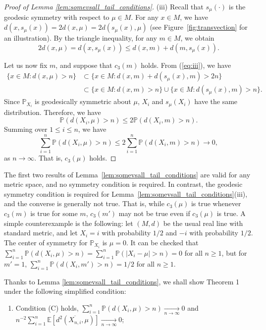 \documentclass[preprint]{imsart}
\theoremstyle{plain}
\newtheorem{remark}{Remark}
\theoremstyle{remark}
\begin{document}
\begin{appendix}
\begin{proof}[Proof of Lemma \ref{lem:somevsall_tail_conditions}]
(iii) Recall that $s_\mu(\cdot)$ is the geodesic symmetry with respect to $\mu \in M$. For any $x \in M$, we have 
$d(x, s_\mu(x)) = 2d(x,\mu) = 2d(s_\mu(x),\mu)$ (see Figure~\ref{fig:transvection} for an illustration). By the triangle inequality, for any $m\in M$, we obtain 
\begin{equation}
    \label{eq:iii} 
    2d(x,\mu) = d(x, s_\mu(x)) \le d(x,m ) + d(m, s_\mu(x)).
\end{equation}

Let us now fix $m$, and suppose that $c_3(m)$ holds. 
From (\ref{eq:iii}), we have 
\begin{align*}
\{x\in M: d(x,\mu) > n\} &\subset \{x\in M: d(x,m) + d(s_\mu(x), m) > 2n\}\\
&\subset \{x\in M: d(x,m) > n\}\cup \{x\in M: d(s_\mu(x),m) > n\}.
\end{align*}
Since $\mathbb{P}_{X_i}$ is geodesically symmetric about $\mu$, $X_i$ and $s_\mu (X_i)$ have the same distribution. Therefore, we have 
$$
\mathbb{P}(d(X_i,\mu) > n ) \le 2\mathbb{P}(d(X_i,m) > n).$$
Summing over $1\le i\le n$, we have 
$$
\sum_{i=1}^n\mathbb{P}(d(X_i,\mu) > n ) \le 2\sum_{i=1}^n\mathbb{P}(d(X_i,m) > n) \to 0,
$$
as $n\to \infty$. That is, $c_3(\mu)$ holds.
\end{proof}


The first two results of Lemma~\ref{lem:somevsall_tail_conditions} are valid for any metric space, and no symmetry condition is required. In contrast, the geodesic symmetry condition is required for Lemma~\ref{lem:somevsall_tail_conditions}(iii), and the converse is generally not true. That is, while $c_3(\mu)$ is true whenever $c_3(m)$ is true for some $m$, $c_3(m')$ may not be true even if $c_3(\mu)$ is true. A simple counterexample is the following: let $(M,d)$ be the usual real line with standard metric, and let $X_i = i$ with probability $1/2$ and $-i$ with probability $1/2$. The center of symmetry for $\mathbb{P}_{X_i}$ is $\mu = 0$. It can be checked that $\sum_{i=1}^n \mathbb{P}(d(X_i,\mu) > n) = \sum_{i=1}^n \mathbb{P}(|X_i - \mu| > n)= 0$ for all $n\ge 1$, but for $m' = 1$, $\sum_{i=1}^n \mathbb{P}(d(X_i,m') > n) = 1/2$ for all $n\ge 1$. 

Thanks to Lemma \ref{lem:somevsall_tail_conditions}, we shall show Theorem 1 under the following simplified condition:
\begin{enumerate}
  \item[(i)]  Condition (C) holds, $\sum_{i=1}^{n} \mathbb{P}(d(X_i, \mu) > n) \underset{n \to \infty}{\to} 0$ and \linebreak $n^{-2}\sum_{i=1}^{n}\mathbb{E}[d^2(\overline{X_{n,i}}, \mu)] \underset{n \to \infty}{\to} 0$;


\end{enumerate}
\end{appendix}
\end{document}
